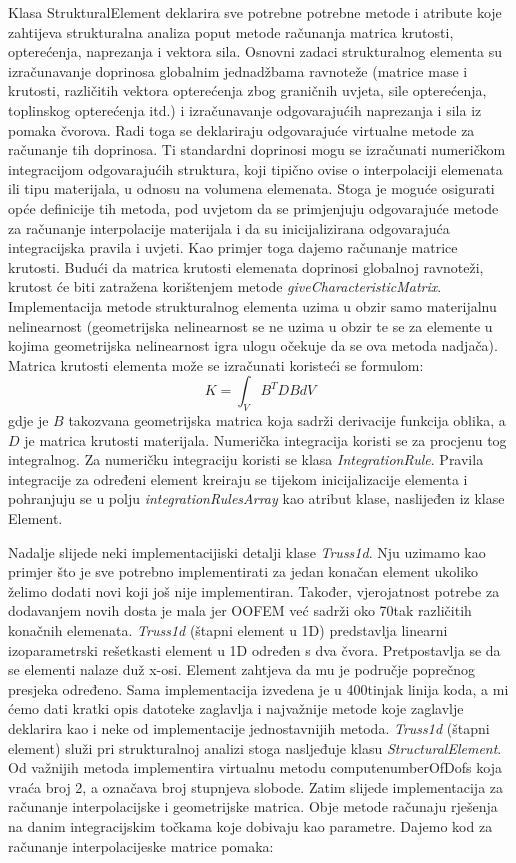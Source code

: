 \documentclass[a4paper,twoside,12pt]{memoir} %
\begin{document}
Klasa StrukturalElement deklarira sve potrebne potrebne metode i atribute koje zahtijeva strukturalna analiza poput metode računanja matrica krutosti, opterećenja, naprezanja i vektora sila. 
Osnovni zadaci strukturalnog elementa su izračunavanje doprinosa globalnim jednadžbama ravnoteže (matrice mase i krutosti, različitih vektora opterećenja zbog graničnih uvjeta, sile opterećenja, toplinskog opterećenja itd.) i izračunavanje odgovarajućih naprezanja i sila iz pomaka čvorova. Radi toga se deklariraju odgovarajuće virtualne metode za računanje tih doprinosa. Ti standardni doprinosi mogu se izračunati numeričkom integracijom odgovarajućih struktura, koji tipično ovise o interpolaciji elemenata ili tipu materijala, u odnosu na volumena elemenata. Stoga je moguće osigurati opće definicije tih metoda, pod uvjetom da se primjenjuju odgovarajuće metode za računanje interpolacije materijala i da su inicijalizirana odgovarajuća integracijska pravila i uvjeti. Kao primjer toga dajemo računanje matrice krutosti. Budući da matrica krutosti elemenata doprinosi globalnoj ravnoteži, krutost će biti zatražena korištenjem metode \textit{giveCharacteristicMatrix}. Implementacija metode strukturalnog elementa uzima u obzir samo materijalnu nelinearnost (geometrijska nelinearnost se ne uzima u obzir te se za elemente u kojima geometrijska nelinearnost igra ulogu očekuje da se ova metoda nadjača). Matrica krutosti elementa može se izračunati koristeći se formulom:
$$ K = \int_V B^T D B dV $$
gdje je $B$ takozvana geometrijska matrica koja sadrži derivacije funkcija oblika, a $D$ je matrica krutosti materijala. Numerička integracija koristi se za procjenu tog integralnog. Za numeričku integraciju koristi se klasa \textit{IntegrationRule}. Pravila integracije za određeni element kreiraju se tijekom inicijalizacije elementa i pohranjuju se u polju \textit{integrationRulesArray} kao atribut klase, naslijeđen iz klase Element. \par

Nadalje slijede neki implementacijiski detalji klase \textit{Truss1d}. Nju uzimamo kao primjer što je sve potrebno implementirati za jedan konačan element ukoliko želimo dodati novi koji još nije implementiran. Također, vjerojatnost potrebe za dodavanjem novih dosta je mala jer OOFEM već sadrži oko 70tak različitih konačnih elemenata. \textit{Truss1d} (štapni element u 1D) predstavlja linearni izoparametrski rešetkasti element u 1D određen s dva čvora. Pretpostavlja se da se elementi nalaze duž x-osi. Element zahtjeva da mu je područje poprečnog presjeka određeno. Sama implementacija izvedena je u 400tinjak linija koda, a mi ćemo dati kratki opis datoteke zaglavlja i najvažnije metode koje zaglavlje deklarira kao i neke od implementacije jednostavnijih metoda. \textit{Truss1d} (štapni element) služi pri strukturalnoj analizi stoga nasljeđuje klasu \textit{StructuralElement}. Od važnijih metoda implementira virtualnu metodu computenumberOfDofs koja vraća broj 2, a označava broj stupnjeva slobode. Zatim slijede implementacija za računanje interpolacijske i geometrijske matrica. Obje metode računaju rješenja na danim integracijskim točkama koje dobivaju kao parametre. Dajemo kod za računanje interpolacijeske matrice pomaka:
\end{document}
